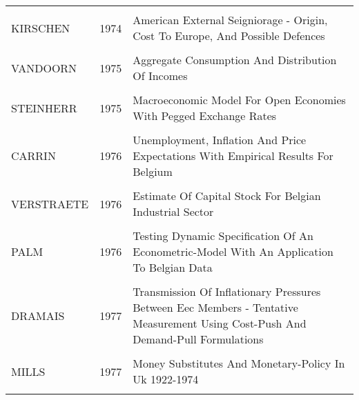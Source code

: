 \documentclass[
  12pt,
  onecolumn]{article}
\begin{document}
\begin{longtable}[t]{lc>{\raggedright\arraybackslash}m{40em}}
\cellcolor{gray!6}{DYKER} & \cellcolor{gray!6}{1974} & \cellcolor{gray!6}{Yugoslav Deficit On Balance Of Payments}\\
KIRSCHEN & 1974 & American External Seigniorage - Origin, Cost To Europe, And Possible Defences\\
\cellcolor{gray!6}{RUIST} & \cellcolor{gray!6}{1975} & \cellcolor{gray!6}{Measuring Capacity Utilization And Excess Demand}\\
\addlinespace
VANDOORN & 1975 & Aggregate Consumption And Distribution Of Incomes\\
\cellcolor{gray!6}{VANDERLO} & \cellcolor{gray!6}{1975} & \cellcolor{gray!6}{Aggregation Of Ces-Type Production Functions}\\
STEINHERR & 1975 & Macroeconomic Model For Open Economies With Pegged Exchange Rates\\
\cellcolor{gray!6}{BARTEN} & \cellcolor{gray!6}{1976} & \cellcolor{gray!6}{Comet - Medium-Term Macroeconomic Model For European Economic Community}\\
CARRIN & 1976 & Unemployment, Inflation And Price Expectations With Empirical Results For Belgium\\
\addlinespace
\cellcolor{gray!6}{SANDMO} & \cellcolor{gray!6}{1976} & \cellcolor{gray!6}{Direct Versus Indirect Pigovian Taxation}\\
VERSTRAETE & 1976 & Estimate Of Capital Stock For Belgian Industrial Sector\\
\cellcolor{gray!6}{GEARY} & \cellcolor{gray!6}{1976} & \cellcolor{gray!6}{Wage And Price Determination In A Labor-Exporting Economy - Case Of Ireland}\\
PALM & 1976 & Testing Dynamic Specification Of An Econometric-Model With An Application To Belgian Data\\
\cellcolor{gray!6}{WHALLEY} & \cellcolor{gray!6}{1976} & \cellcolor{gray!6}{Some General Equilibrium-Analysis Applied To Fiscal Harmonization In European-Community}\\
\addlinespace
DRAMAIS & 1977 & Transmission Of Inflationary Pressures Between Eec Members - Tentative Measurement Using Cost-Push And Demand-Pull Formulations\\
\cellcolor{gray!6}{PEEL} & \cellcolor{gray!6}{1977} & \cellcolor{gray!6}{Properties Of Alternative Monetary Rules In An Extension Of Blacks Model}\\
MILLS & 1977 & Money Substitutes And Monetary-Policy In Uk 1922-1974\\
\cellcolor{gray!6}{HOLDEN} & \cellcolor{gray!6}{1977} & \cellcolor{gray!6}{Unemployment And Unanticipated Inflation - Some Empirical Results For 6 Countries}\\

\end{longtable}
\end{document}
